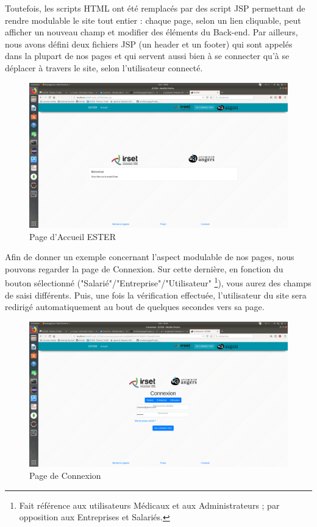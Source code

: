Toutefois, les scripts HTML ont été remplacés par des script JSP permettant de rendre modulable le site tout entier : chaque page, selon un lien cliquable, peut afficher un nouveau champ et modifier des éléments du Back-end. Par ailleurs, nous avons défini deux fichiers JSP (un header et un footer) qui sont appelés dans la plupart de nos pages et qui servent aussi bien à se connecter qu'à se déplacer à travers le site, selon l'utilisateur connecté.

\begin{figure}[H]
    \begin{center}
	\includegraphics[scale=0.2,trim=4cm 0cm 4cm 5.3cm, clip=true]{img/ESTER}
    \end{center}
    \caption{Page d'Accueil ESTER}
\end{figure}

Afin de donner un exemple concernant l'aspect modulable de nos pages, nous pouvons regarder la page de Connexion. Sur cette dernière, en fonction du bouton sélectionné ("Salarié"/"Entreprise"/"Utilisateur" \footnote{Fait référence aux utilisateurs Médicaux et aux Administrateurs ; par opposition aux Entreprises et Salariés.}), vous aurez des champs de saisi différents. Puis, une fois la vérification effectuée, l'utilisateur du site sera redirigé automatiquement au bout de quelques secondes vers sa page.

\begin{figure}[H]
    \begin{center}
	\includegraphics[scale=0.2,trim=4cm 0cm 4cm 5.3cm, clip=true]{img/Connexion}
    \end{center}
    \caption{Page de Connexion}
\end{figure}

